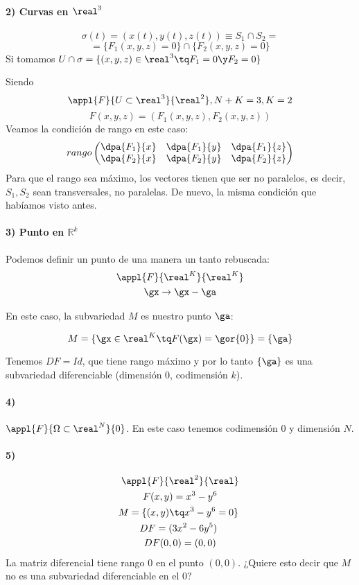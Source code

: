 \paragraph{2)  Curvas en $\real^3$}
  
  \[\sigma(t) = (x(t),y(t),z(t))\equiv S_1 \cap S_2 = \]
  \[= \{F_1(x,y,z) = 0\}\cap \{F_2(x,y,z) = 0\}\]
  Si tomamos $U\cap \sigma = \{(x,y,z)\in\real^3 \tq F_1 = 0 \y F_2 = 0\}$

  Siendo \[\appl{F}{U\subset\real^3}{\real^2}, N+K=3,K=2\]\[F(x,y,z) = (F_1(x,y,z),F_2(x,y,z))\]
  Veamos la condición de rango en este caso:
  \[rango \begin{pmatrix} \dpa{F_1}{x}&\dpa{F_1}{y}&\dpa{F_1}{z}\\\dpa{F_2}{x}&\dpa{F_2}{y}&\dpa{F_2}{z}\end{pmatrix}\]
  Para que el rango sea máximo, los vectores tienen que ser no paralelos, es decir, $S_1, S_2$ sean transversales, no paralelas. De nuevo, la misma condición que habíamos visto antes.
  
  \paragraph{3) Punto en $ℝ^k$}
  
  Podemos definir un punto de una manera un tanto rebuscada:
 \begin{gather*}
 \appl{F}{\real^K}{\real^K}\\
 \gx \rightarrow \gx - \ga
 \end{gather*}  
 
 En este caso, la subvariedad $M$ es nuestro punto $\ga$:
 
 \[M = \{\gx \in \real^K \tq F(\gx) = \gor{0}\} = \{\ga\}\]
 
 Tenemos $DF = Id $, que tiene rango máximo y por lo tanto $\{\ga\}$ es una subvariedad diferenciable (dimensión 0, codimensión $k$).
 
 \paragraph{4)} $\appl{F}{\Omega\subset\real^N}{0}$. En este caso tenemos codimensión $0$ y dimensión $N$.
 
\paragraph{5)}

  \begin{gather*}
  \appl{F}{\real^2}{\real}\\
   F(x,y) = x^3 - y^6 \\
  M = \{(x,y) \tq x^3-y^6 = 0\} \\
  DF = (3x^2-6y^5) \\
  DF(0,0) = (0,0)
  \end{gather*}
  La matriz diferencial tiene rango $0$ en el punto $(0,0)$. ¿Quiere esto decir que $M$ no es una subvariedad diferenciable en el 0?
  
